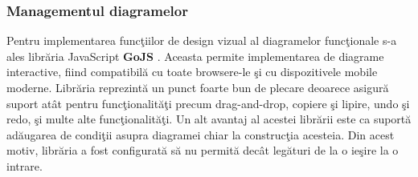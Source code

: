\subsubsection{Managementul diagramelor}
Pentru implementarea funcţiilor de design vizual al diagramelor funcţionale s-a ales librăria JavaScript \textbf{GoJS} \autocite{gojs}. Aceasta permite implementarea de diagrame interactive, fiind compatibilă cu toate browsere-le şi cu dispozitivele mobile moderne. Librăria reprezintă un punct foarte bun de plecare deoarece asigură suport atât pentru funcţionalităţi precum drag-and-drop, copiere şi lipire, undo şi redo, şi multe alte funcţionalităţi. Un alt avantaj al acestei librării este ca suportă adăugarea de condiţii asupra diagramei chiar la construcţia acesteia. Din acest motiv, librăria a fost configurată să nu permită decât legături de la o ieşire la o intrare.

